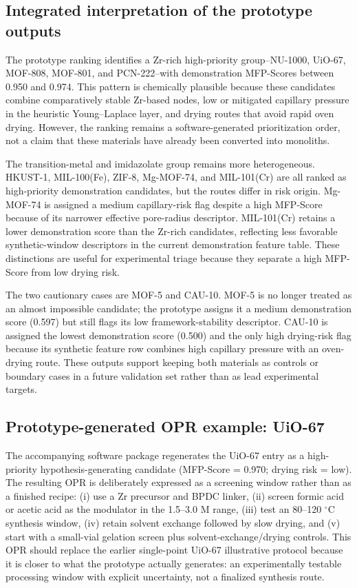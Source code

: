 \documentclass[12pt,a4paper]{article}
\begin{document}
\subsection{Integrated interpretation of the prototype outputs}

The prototype ranking identifies a Zr-rich high-priority group--NU-1000, UiO-67, MOF-808, MOF-801, and PCN-222--with demonstration MFP-Scores between 0.950 and 0.974. This pattern is chemically plausible because these candidates combine comparatively stable Zr-based nodes, low or mitigated capillary pressure in the heuristic Young--Laplace layer, and drying routes that avoid rapid oven drying. However, the ranking remains a software-generated prioritization order, not a claim that these materials have already been converted into monoliths.

The transition-metal and imidazolate group remains more heterogeneous. HKUST-1, MIL-100(Fe), ZIF-8, Mg-MOF-74, and MIL-101(Cr) are all ranked as high-priority demonstration candidates, but the routes differ in risk origin. Mg-MOF-74 is assigned a medium capillary-risk flag despite a high MFP-Score because of its narrower effective pore-radius descriptor. MIL-101(Cr) retains a lower demonstration score than the Zr-rich candidates, reflecting less favorable synthetic-window descriptors in the current demonstration feature table. These distinctions are useful for experimental triage because they separate a high MFP-Score from low drying risk.

The two cautionary cases are MOF-5 and CAU-10. MOF-5 is no longer treated as an almost impossible candidate; the prototype assigns it a medium demonstration score (0.597) but still flags its low framework-stability descriptor. CAU-10 is assigned the lowest demonstration score (0.500) and the only high drying-risk flag because its synthetic feature row combines high capillary pressure with an oven-drying route. These outputs support keeping both materials as controls or boundary cases in a future validation set rather than as lead experimental targets.

\subsection{Prototype-generated OPR example: UiO-67}

The accompanying software package regenerates the UiO-67 entry as a high-priority hypothesis-generating candidate (MFP-Score = 0.970; drying risk = low). The resulting OPR is deliberately expressed as a screening window rather than as a finished recipe: (i) use a Zr precursor and BPDC linker, (ii) screen formic acid or acetic acid as the modulator in the 1.5--3.0 M range, (iii) test an 80--120 $^\circ$C synthesis window, (iv) retain solvent exchange followed by slow drying, and (v) start with a small-vial gelation screen plus solvent-exchange/drying controls. This OPR should replace the earlier single-point UiO-67 illustrative protocol because it is closer to what the prototype actually generates: an experimentally testable processing window with explicit uncertainty, not a finalized synthesis route.
\end{document}
